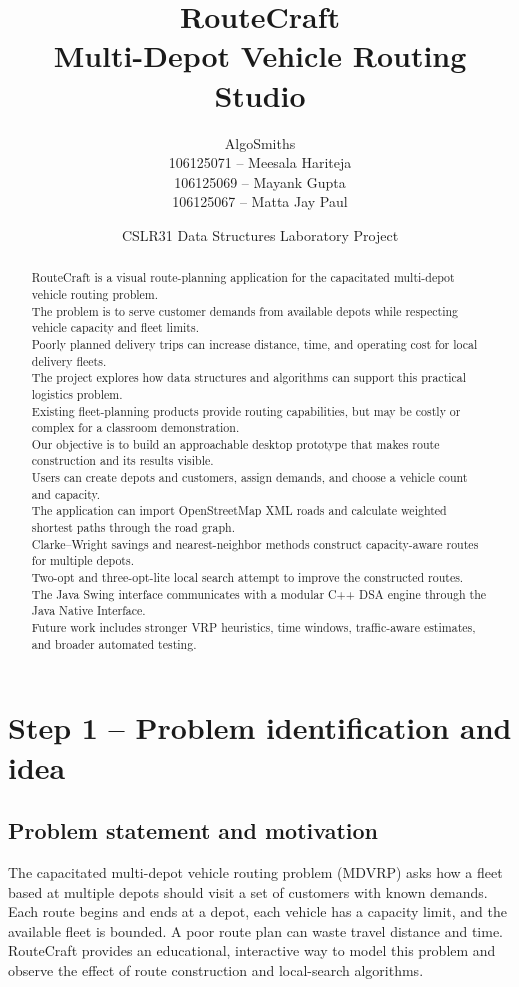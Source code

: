 \documentclass[11pt,a4paper]{article}
\title{\textbf{RouteCraft}\\Multi-Depot Vehicle Routing Studio}
\author{
    AlgoSmiths\\
    106125071 -- Meesala Hariteja\\
    106125069 -- Mayank Gupta\\
    106125067 -- Matta Jay Paul
}
\date{CSLR31 Data Structures Laboratory Project}
\begin{document}
\maketitle

\begin{abstract}
RouteCraft is a visual route-planning application for the capacitated multi-depot vehicle routing problem.\\
The problem is to serve customer demands from available depots while respecting vehicle capacity and fleet limits.\\
Poorly planned delivery trips can increase distance, time, and operating cost for local delivery fleets.\\
The project explores how data structures and algorithms can support this practical logistics problem.\\
Existing fleet-planning products provide routing capabilities, but may be costly or complex for a classroom demonstration.\\
Our objective is to build an approachable desktop prototype that makes route construction and its results visible.\\
Users can create depots and customers, assign demands, and choose a vehicle count and capacity.\\
The application can import OpenStreetMap XML roads and calculate weighted shortest paths through the road graph.\\
Clarke--Wright savings and nearest-neighbor methods construct capacity-aware routes for multiple depots.\\
Two-opt and three-opt-lite local search attempt to improve the constructed routes.\\
The Java Swing interface communicates with a modular C++ DSA engine through the Java Native Interface.\\
Future work includes stronger VRP heuristics, time windows, traffic-aware estimates, and broader automated testing.
\end{abstract}

\section{Step 1 -- Problem identification and idea}

\subsection{Problem statement and motivation}
The capacitated multi-depot vehicle routing problem (MDVRP) asks how a fleet
based at multiple depots should visit a set of customers with known demands.
Each route begins and ends at a depot, each vehicle has a capacity limit, and
the available fleet is bounded. A poor route plan can waste travel distance
and time. RouteCraft provides an educational, interactive way to model this
problem and observe the effect of route construction and local-search
algorithms.
\end{document}
